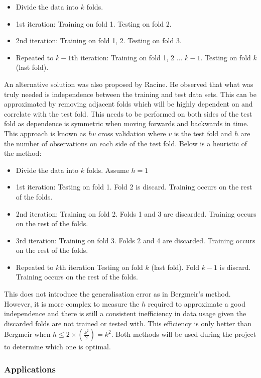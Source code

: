\documentclass[10pt,onecolumn,letterpaper]{article}
\begin{document}
\begin{itemize}
 	\item Divide the data into $k$ folds. 
	\item 1st iteration: Training on fold 1. Testing on fold 2.
	\item 2nd iteration: Training on fold 1, 2. Testing on fold 3. 
	\item Repeated to $k-1$th iteration: Training on fold 1, 2 ... $k-1$. Testing on fold $k$ (last fold). 
\end{itemize}

An alternative solution\cite{Racine} was also proposed by Racine. He observed that what was truly needed is independence between the training and test data sets. This can be approximated by removing adjacent folds which will be highly dependent on and correlate with the test fold. This needs to be performed on both sides of the test fold as dependence is symmetric when moving forwards and backwards in time. This approach is known as $hv$ cross validation where $v$ is the test fold and $h$ are the number of observations on each side of the test fold. Below is a heuristic of the method:

\begin{itemize}
 	\item Divide the data into $k$ folds. Assume $h = 1$ 
	\item 1st iteration: Testing on fold 1. Fold 2 is discard. Training occurs on the rest of the folds. 
	\item 2nd iteration: Training on fold 2.  Folds 1 and 3 are discarded. Training occurs on the rest of the folds. 
	\item 3rd iteration: Training on fold 3.  Folds 2 and 4 are discarded. Training occurs on the rest of the folds. 
	\item Repeated to $k$th iteration Testing on fold $k$ (last fold). Fold $k-1$ is discard. Training occurs on the rest of the folds. 
\end{itemize}

This does not introduce the generalisation error as in Bergmeir's method. However, it is more complex to measure the $h$ required to approximate a good independence and there is still a consistent inefficiency in data usage given the discarded folds are not trained or tested with. This efficiency is only better than Bergmeir when $h \leq 2\times(\frac{k^{2}}{2}) = k^{2}$. Both methods will be used during the project to determine which one is optimal.

\subsubsection{Applications} 
\end{document}
